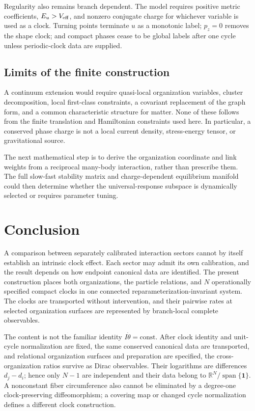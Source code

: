 \documentclass[11pt]{article}
\theoremstyle{plain}
\begin{document}
Regularity also remains branch dependent. The model requires positive metric coefficients, $E_u>V_{\rm eff}$, and nonzero conjugate charge for whichever variable is used as a clock. Turning points terminate $u$ as a monotonic label; $p_z=0$ removes the shape clock; and compact phases cease to be global labels after one cycle unless periodic-clock data are supplied.

\subsection{Limits of the finite construction}

A continuum extension would require quasi-local organization variables,
cluster decomposition, local first-class constraints, a covariant replacement
of the graph form, and a common characteristic structure for matter.  None of
these follows from the finite translation and Hamiltonian constraints used
here.  In particular, a conserved phase charge is not a local current density,
stress-energy tensor, or gravitational source.

The next mathematical step is to derive the organization coordinate and link
weights from a reciprocal many-body interaction, rather than prescribe them.
The full slow-fast stability matrix and charge-dependent equilibrium manifold
could then determine whether the universal-response subspace is dynamically
selected or requires parameter tuning.

\section{Conclusion}

A comparison between separately calibrated interaction sectors cannot by
itself establish an intrinsic clock effect.  Each sector may admit its own
calibration, and the result depends on how endpoint canonical data are
identified.  The present construction places both organizations, the particle
relations, and $N$ operationally specified compact clocks in one connected
reparameterization-invariant system.  The clocks are transported without
intervention, and their pairwise rates at selected organization surfaces are
represented by branch-local complete observables.

The content is not the familiar identity
$I\dot\theta=\mathrm{const}$.  After clock identity and unit-cycle
normalization are fixed, the same conserved canonical data are transported,
and relational organization surfaces and preparation are specified, the
cross-organization ratios survive as Dirac observables.  Their logarithms are
differences $d_j-d_i$; hence only $N-1$ are independent and their data belong
to $\mathbb R^N/\operatorname{span}\{\boldsymbol 1\}$.  A nonconstant fiber
circumference also cannot be eliminated by a degree-one clock-preserving
diffeomorphism; a covering map or changed cycle normalization defines a
different clock construction.
\end{document}
